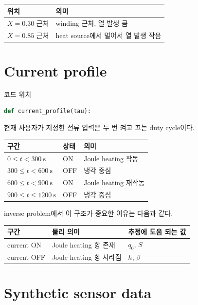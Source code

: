 \documentclass[11pt]{article}
\begin{document}
\begin{center}
\begin{tabular}{ll}
\toprule
위치 & 의미 \\
\midrule
\(X=0.30\) 근처 & winding 근처, 열 발생 큼 \\
\(X=0.85\) 근처 & heat source에서 멀어서 열 발생 작음 \\
\bottomrule
\end{tabular}
\end{center}

\section{Current profile}

코드 위치

\begin{lstlisting}[language=Python]
def current_profile(tau):
\end{lstlisting}

현재 사용자가 지정한 전류 입력은 두 번 켜고 끄는 duty cycle이다.

\begin{center}
\begin{tabular}{lll}
\toprule
구간 & 상태 & 의미 \\
\midrule
\(0 \le t < 300~\mathrm{s}\) & ON & Joule heating 작동 \\
\(300 \le t < 600~\mathrm{s}\) & OFF & 냉각 중심 \\
\(600 \le t < 900~\mathrm{s}\) & ON & Joule heating 재작동 \\
\(900 \le t \le 1200~\mathrm{s}\) & OFF & 냉각 중심 \\
\bottomrule
\end{tabular}
\end{center}

inverse problem에서 이 구조가 중요한 이유는 다음과 같다.

\begin{center}
\begin{tabular}{lll}
\toprule
구간 & 물리 의미 & 추정에 도움 되는 값 \\
\midrule
current ON & Joule heating 항 존재 & \(q_0\), \(S\) \\
current OFF & Joule heating 항 사라짐 & \(h\), \(\beta\) \\
\bottomrule
\end{tabular}
\end{center}

\section{Synthetic sensor data}
\end{document}
